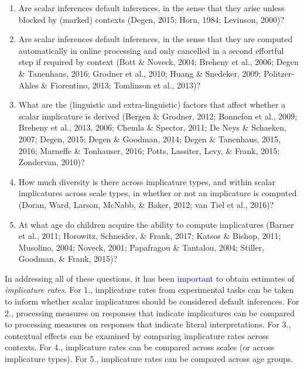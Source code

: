 \documentclass[man]{apa6}
\newcommand{\change}[1]{\textcolor{Blue}{#1}}
\theoremstyle{definition}
\theoremstyle{definition}
\theoremstyle{definition}
\theoremstyle{remark}
\begin{document}
\begin{enumerate}
\def\labelenumi{\arabic{enumi}.}
\item
  Are scalar inferences default inferences, in the sense that they arise
  unless blocked by (marked) contexts (Degen, 2015; Horn, 1984;
  Levinson, 2000)?
\item
  Are scalar inferences default inferences, in the sense that they are
  computed automatically in online processing and only cancelled in a second effortful step if required by context (Bott \&
  Noveck, 2004; Breheny et al., 2006; Degen \& Tanenhaus, 2016; Grodner
  et al., 2010; Huang \& Snedeker, 2009; Politzer-Ahles \& Fiorentino,
  2013; Tomlinson et al., 2013)?
\item
  What are the (linguistic and extra-linguistic) factors that affect
  whether a scalar implicature is derived (Bergen \& Grodner, 2012;
  Bonnefon et al., 2009; Breheny et al., 2013, 2006; Chemla \& Spector,
  2011; De Neys \& Schaeken, 2007; Degen, 2015; Degen \& Goodman, 2014;
  Degen \& Tanenhaus, 2015, 2016; Marneffe \& Tonhauser, 2016; Potts,
  Lassiter, Levy, \& Frank, 2015; Zondervan, 2010)?
\item
  How much diversity is there across implicature types, and within
  scalar implicatures across scale types, in whether or not an
  implicature is computed (Doran, Ward, Larson, McNabb, \& Baker, 2012;
  van Tiel et al., 2016)?
\item
  At what age do children acquire the ability to compute implicatures
  (Barner et al., 2011; Horowitz, Schneider, \& Frank, 2017; Katsos \&
  Bishop, 2011; Musolino, 2004; Noveck, 2001; Papafragou \& Tantalou,
  2004; Stiller, Goodman, \& Frank, 2015)?
\end{enumerate}

In addressing all of these questions, it has been \change{important} to obtain
estimates of \emph{implicature rates}. For 1., implicature rates from
experimental tasks can be taken to inform whether scalar implicatures
should be considered default inferences. For 2., processing measures on
responses that indicate implicatures can be compared to processing
measures on responses that indicate literal interpretations. For 3.,
contextual effects can be examined by comparing implicature rates across
contexts. For 4., implicature rates can be compared across scales (or
across implicature types). For 5., implicature rates can be compared
across age groups.
\end{document}

